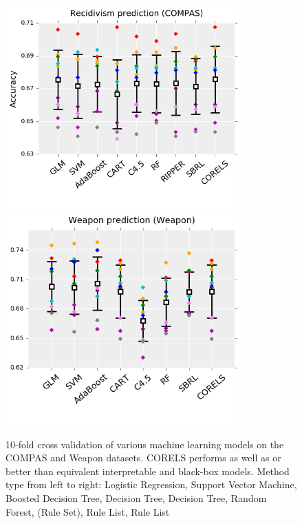 \begin{figure}
\begin{center}
\begin{minipage}{\textwidth}
\includegraphics[width=0.8\textwidth]{figs/compas_accuracy.png}
\includegraphics[width=0.8\textwidth]{figs/weapon_accuracy.png}
\caption{10-fold cross validation of various machine learning models on the COMPAS and Weapon datasets.
CORELS performs as well as or better than equivalent interpretable and black-box models.
Method type from left to right: Logistic Regression, Support Vector Machine, Boosted Decision Tree, Decision Tree, Decision Tree, Random Forest, (Rule Set), Rule List, Rule List}
\end{minipage}
\end{center}
\label{fig:accuracy}
\end{figure}
